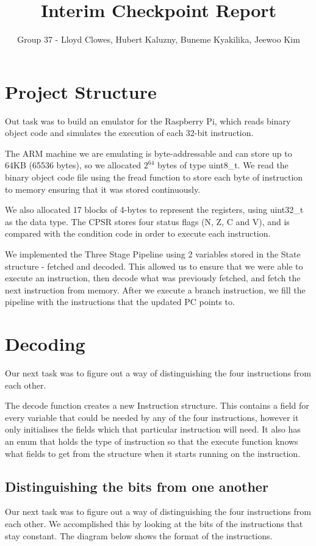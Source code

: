 \documentclass[a4paper]{article}
\title{Interim Checkpoint Report}
\author{Group 37 - Lloyd Clowes, Hubert Kaluzny, Buneme Kyakilika, Jeewoo Kim}
\begin{document}
\maketitle

\section{Project Structure}
Out task was to build an emulator for the Raspberry Pi, which reads binary object code and simulates the execution of each 32-bit instruction.

The ARM machine we are emulating is byte-addressable and can store up to 64KB (65536 bytes), so we allocated $2^{64}$ bytes of type uint8\_t. We read the binary object code file using the fread function to store each byte of instruction to memory ensuring that it was stored continuously.

We also allocated 17 blocks of 4-bytes to represent the registers, using uint32\_t as the data type. The CPSR stores four status flags (N, Z, C and V), and is compared with the condition code in order to execute each instruction.

We implemented the Three Stage Pipeline using 2 variables stored in the State structure - fetched and decoded. This allowed us to ensure that we were able to execute an instruction, then decode what was previously fetched, and fetch the next instruction from memory. After we execute a branch instruction, we fill the pipeline with the instructions that the updated PC points to.

\section{Decoding}
Our next task was to figure out a way of distinguishing the four instructions from each other.

The decode function creates a new Instruction structure. This contains a field for every variable that could be needed by any of the four instructions, however it only initialises the fields which that particular instruction will need. It also has an enum that holds the type of instruction so that the execute function knows what fields to get from the structure when it starts running on the instruction.

\subsection{Distinguishing the bits from one another}
Our next task was to figure out a way of distinguishing the four instructions from each other. We accomplished this by looking at the bits of the instructions that stay constant. The diagram below shows the format of the instructions.
\end{document}
